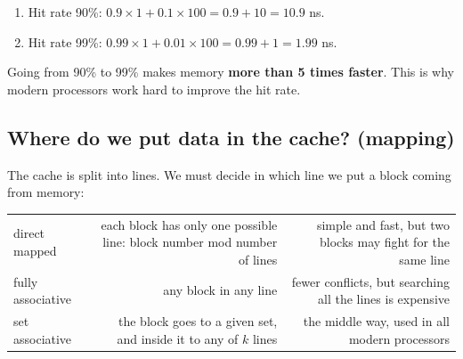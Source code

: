 \begin{khatwa}[: $t_{cache} = 1$ ns, $t_{RAM} = 100$ ns]
    \begin{enumerate}
        \item Hit rate 90\%: $0.9 \times 1 + 0.1 \times 100 = 0.9 + 10 = 10.9$ ns.
        \item Hit rate 99\%: $0.99 \times 1 + 0.01 \times 100 = 0.99 + 1 = 1.99$ ns.
    \end{enumerate}
    Going from 90\% to 99\% makes memory \textbf{more than 5 times faster}. This is why modern processors work hard to improve the hit rate.
\end{khatwa}

\subsection{Where do we put data in the cache? (mapping)}
The cache is split into lines. We must decide in which line we put a block coming from memory:

\begin{center}
\small
\begin{tabularx}{\linewidth}{|>{\centering\arraybackslash}p{3.4cm}|R|R|}
    \hline
     &  &  \\ \hline
    direct mapped & each block has only one possible line: block number mod number of lines & simple and fast, but two blocks may fight for the same line \\ \hline
    fully associative & any block in any line & fewer conflicts, but searching all the lines is expensive \\ \hline
    set associative & the block goes to a given set, and inside it to any of $k$ lines & the middle way, used in all modern processors \\ \hline
\end{tabularx}
\end{center}

